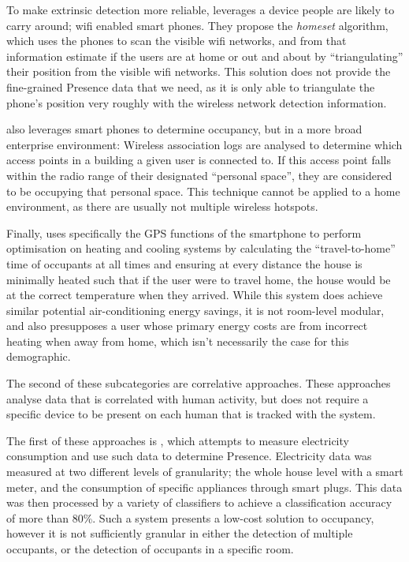 \documentclass[../thesis/thesis.tex]{subfiles}
\begin{document}
To make extrinsic detection more reliable, \cite{kleiminger2013inferring} leverages a device people are likely to carry around; wifi enabled smart phones. They propose the \textit{homeset} algorithm, which uses the phones to scan the visible wifi networks, and from that information estimate if the users are at home or out and about by ``triangulating'' their position from the visible wifi networks. This solution does not provide the fine-grained Presence data that we need, as it is only able to triangulate the phone's position very roughly with the wireless network detection information.

\cite{balaji2013sentinel} also leverages smart phones to determine occupancy, but in a more broad enterprise environment: Wireless association logs are analysed to determine which access points in a building a given user is connected to. If this access point falls within the radio range of their designated ``personal space'', they are considered to be occupying that personal space. This technique cannot be applied to a home environment, as there are usually not multiple wireless hotspots.

Finally, \cite{gupta2009adding} uses specifically the GPS functions of the smartphone to perform optimisation on heating and cooling systems by calculating the ``travel-to-home'' time of occupants at all times and ensuring at every distance the house is minimally heated such that if the user were to travel home, the house would be at the correct temperature when they arrived. While this system does achieve similar potential air-conditioning energy savings, it is not room-level modular, and also presupposes a user whose primary energy costs are from incorrect heating when away from home, which isn't necessarily the case for this demographic.

The second of these subcategories are correlative approaches. These approaches analyse data that is correlated with human activity, but does not require a specific device to be present on each human that is tracked with the system.

The first of these approaches is \cite{kleiminger2013occupancy}, which attempts to measure electricity consumption and use such data to determine Presence. Electricity data was measured at two different levels of granularity; the whole house level with a smart meter, and the consumption of specific appliances through smart plugs. This data was then processed by a variety of classifiers to achieve a classification accuracy of more than 80\%. Such a system presents a low-cost solution to occupancy, however it is not sufficiently granular in either the detection of multiple occupants, or the detection of occupants in a specific room.
\end{document}
